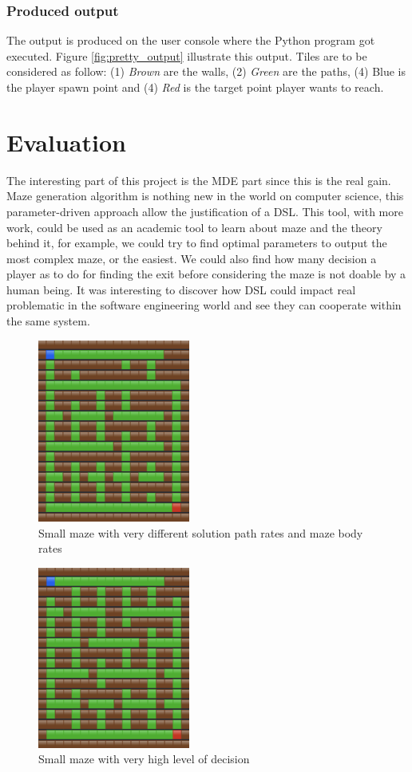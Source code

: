 \documentclass[review]{elsarticle}
\begin{document}
\subsubsection{Produced output}
The output is produced on the user console where the Python program got executed. Figure \ref{fig:pretty_output} illustrate this output. Tiles are to be considered as follow: (1) \textit{Brown} are the walls, (2) \textit{Green} are the paths, (4) Blue is the player spawn point and (4) \textit{Red} is the target point player wants to reach.

\section{Evaluation}
The interesting part of this project is the MDE part since this is the real gain. Maze generation algorithm is nothing new in the world on computer science, this parameter-driven approach allow the justification of a DSL. This tool, with more work, could be used as an academic tool to learn about maze and the theory behind it, for example, we could try to find optimal parameters to output the most complex maze, or the easiest. We could also find how many decision a player as to do for finding the exit before considering the maze is not doable by a human being. It was interesting to discover how DSL could impact real problematic in the software engineering world and see they can cooperate within the same system.

\begin{figure}
	\includegraphics[width=50mm]{maze_diff.png}
	\centering
	\caption{Small maze with very different solution path rates and maze body rates}
	\label{fig:maze_diff}
\end{figure}

\begin{figure}
	\includegraphics[width=50mm]{maze_dr.png}
	\centering
	\caption{Small maze with very high level of decision}
	\label{fig:maze_dr}
\end{figure}
\end{document}
